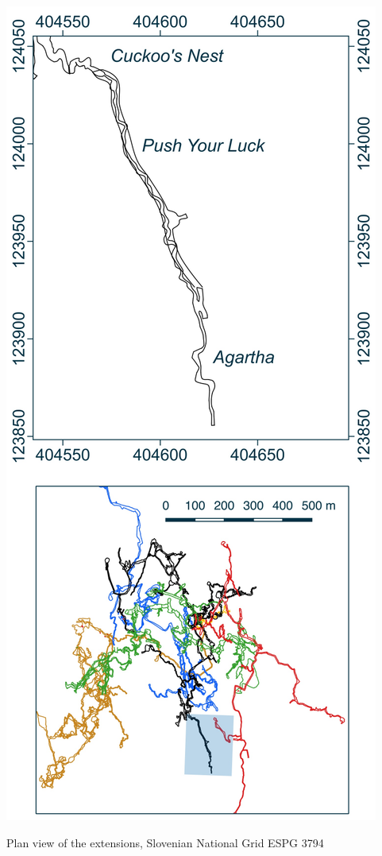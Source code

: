  \begin{marginfigure}
\checkoddpage \ifoddpage \forcerectofloat \else \forceversofloat \fi
\centering
\includegraphics[width= \linewidth]{images/little_insets/push_your_luck_inset.pdf}
 \caption*{Plan view of the \protect{} extensions, Slovenian National Grid ESPG 3794}
 \label{push your luck inset}
\end{marginfigure}


